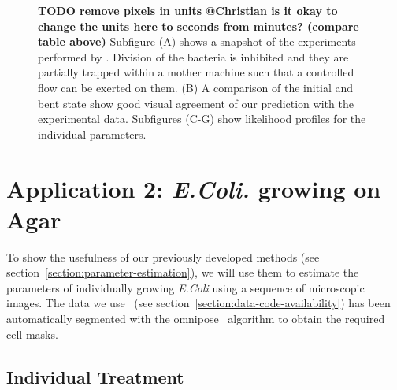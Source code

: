 \documentclass{article}
\begin{document}
\begin{figure}[H]
\begin{minipage}{0.62\textwidth}
\begin{tikzonimage}[width=0.33\textwidth]
        \end{tikzonimage}%
    \end{minipage}
    \caption{
        \textbf{TODO remove pixels in units}
        \textbf{@Christian is it okay to change the units here to seconds from minutes? (compare
        table above)}
        Subfigure (A) shows a snapshot of the experiments performed by \cite{Amir2014_2}.
        Division of the bacteria is inhibited and they are partially trapped within a mother machine
        such that a controlled flow can be exerted on them.
        (B) A comparison of the initial and bent state show good visual agreement of our prediction
        with the experimental data.
        Subfigures (C-G) show likelihood profiles for the individual parameters.
    }
    \label{fig:amir-bending-simulation}
\end{figure}


\section{Application 2: \textit{E.Coli.} growing on Agar}
\label{section:application-2}
To show the usefulness of our previously developed methods
(see section~\ref{section:parameter-estimation}), we will use them to estimate the parameters of
individually growing \textit{E.Coli} using a sequence of microscopic images.
The data we use~\cite{https://doi.org/10.3203/iwf/k-129} (see
section~\ref{section:data-code-availability}) has been automatically segmented with the
omnipose~\cite{Cutler2022} algorithm to obtain the required cell masks.

\subsection{Individual Treatment}
\end{document}
